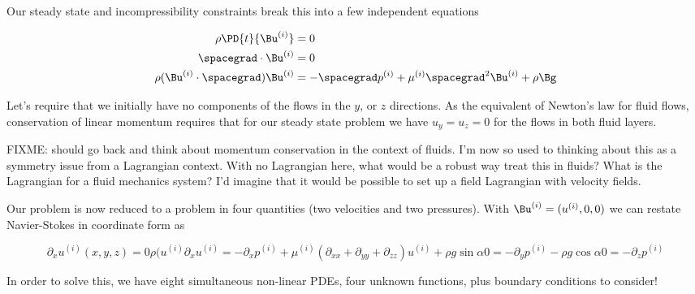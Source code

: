Our steady state and incompressibility constraints break this into a few independent equations

\begin{align}\label{eqn:twoLayerInclinedFlow:30}
\rho \PD{t}{\Bu^{(i)}} &= 0 \\
\spacegrad \cdot \Bu^{(i)} &= 0 \\
\rho (\Bu^{(i)} \cdot \spacegrad) \Bu^{(i)} &= - \spacegrad p^{(i)} + \mu^{(i)} \spacegrad^2 \Bu^{(i)} + \rho \Bg
\end{align}

Let's require that we initially have no components of the flows in the $y$, or $z$ directions.  As the equivalent of Newton's law for fluid flows, conservation of linear momentum requires that for our steady state problem we have $u_y = u_z = 0$ for the flows in both fluid layers.  

FIXME: should go back and think about momentum conservation in the context of fluids.  I'm now so used to thinking about this as a symmetry issue from a Lagrangian context.  With no Lagrangian here, what would be a robust way treat this in fluids?  What is the Lagrangian for a fluid mechanics system?  I'd imagine that it would be possible to set up a field Lagrangian with velocity fields.

Our problem is now reduced to a problem in four quantities (two velocities and two pressures).  With $\Bu^{(i)} = (u^{(i)}, 0, 0)$ we can restate Navier-Stokes in coordinate form as

\begin{subequations}
\label{eqn:twoLayerInclinedFlow:50}
\begin{equation}\label{eqn:twoLayerInclinedFlow:110}
\partial_x u^{(i)}(x,y,z) = 0
\end{equation}
\begin{equation}\label{eqn:twoLayerInclinedFlow:130}
\rho (u^{(i)} \partial_x u^{(i)} = - \partial_x p^{(i)} + \mu^{(i)} (\partial_{xx} + \partial_{yy} + \partial_{zz}) u^{(i)} + \rho g \sin\alpha 
\end{equation}
\begin{equation}\label{eqn:twoLayerInclinedFlow:150}
0 = - \partial_y p^{(i)} - \rho g \cos\alpha 
\end{equation}
\begin{equation}\label{eqn:twoLayerInclinedFlow:155}
0 = - \partial_z p^{(i)} 
\end{equation}
\end{subequations}

In order to solve this, we have eight simultaneous non-linear PDEs, four unknown functions, plus boundary conditions to consider!

